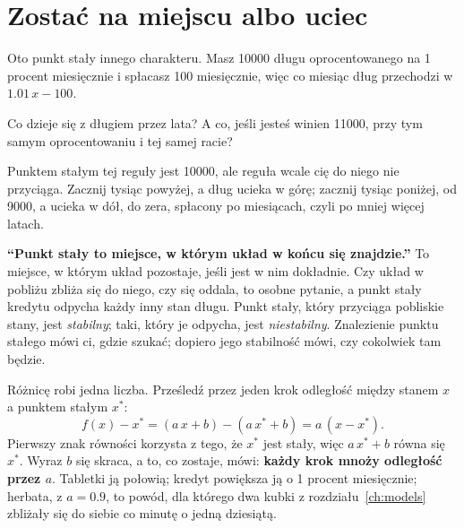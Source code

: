 \section{Zostać na miejscu albo uciec}
\label{sec:ch02-stability}

\noindent
Oto punkt stały innego charakteru. Masz \num{10000} długu oprocentowanego
na 1 procent miesięcznie i spłacasz 100 miesięcznie, więc co miesiąc dług
przechodzi w $\num{1.01}\,x - 100$.

\begin{think}
Co dzieje się z długiem przez lata? A co, jeśli jesteś winien \num{11000},
przy tym samym oprocentowaniu i tej samej racie?
\end{think}
Punktem stałym tej reguły jest \num{10000}, ale reguła wcale cię do niego
nie przyciąga. Zacznij tysiąc powyżej, a dług ucieka w górę; zacznij tysiąc
poniżej, od \num{9000}, a ucieka w dół, do zera, spłacony po
 miesiącach, czyli po mniej więcej
 latach.

\begin{trapbox}
\textbf{\enquote{Punkt stały to miejsce, w którym układ w końcu się
znajdzie.}} To miejsce, w którym układ pozostaje, jeśli jest w nim
dokładnie. Czy układ w pobliżu zbliża się do niego, czy się oddala, to
osobne pytanie, a punkt stały kredytu odpycha każdy inny stan długu. Punkt
stały, który przyciąga pobliskie stany, jest \emph{stabilny}; taki, który
je odpycha, jest \emph{niestabilny}. Znalezienie punktu stałego mówi ci,
gdzie szukać; dopiero jego stabilność mówi, czy cokolwiek tam będzie.
\end{trapbox}

\noindent
Różnicę robi jedna liczba. Prześledź przez jeden krok odległość między
stanem $x$ a punktem stałym $x^{*}$:
\[ f(x) - x^{*} = (a\,x + b) - (a\,x^{*} + b) = a\,(x - x^{*}) . \]
Pierwszy znak równości korzysta z tego, że $x^{*}$ jest stały, więc
$a\,x^{*} + b$ równa się $x^{*}$. Wyraz $b$ się skraca, a to, co zostaje,
mówi: \textbf{każdy krok mnoży odległość przez $a$}. Tabletki ją połowią;
kredyt powiększa ją o 1 procent miesięcznie; herbata, z $a = \num{0.9}$,
to powód, dla którego dwa kubki z rozdziału~\ref{ch:models} zbliżały się
do siebie co minutę o jedną dziesiątą.

